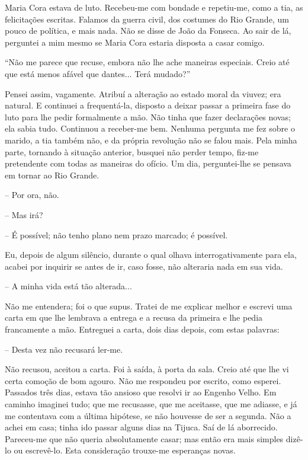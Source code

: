 Maria Cora estava de luto. Recebeu-me com bondade e repetiu-me, como a
tia, as felicitações escritas. Falamos da guerra civil, dos costumes do
Rio Grande, um pouco de política, e mais nada. Não se disse de João da
Fonseca. Ao sair de lá, perguntei a mim mesmo se Maria Cora estaria
disposta a casar comigo.

``Não me parece que recuse, embora não lhe ache maneiras especiais.
Creio até que está menos afável que dantes... Terá mudado?''

Pensei assim, vagamente. Atribuí a alteração ao estado moral da viuvez;
era natural. E continuei a frequentá-la, disposto a deixar passar a
primeira fase do luto para lhe pedir formalmente a mão. Não tinha que
fazer declarações novas; ela sabia tudo. Continuou a receber-me bem.
Nenhuma pergunta me fez sobre o marido, a tia também não, e da própria
revolução não se falou mais. Pela minha parte, tornando à situação
anterior, busquei não perder tempo, fiz-me pretendente com todas as
maneiras do ofício. Um dia, perguntei-lhe se pensava em tornar ao Rio
Grande.

-- Por ora, não.

-- Mas irá?

-- É possível; não tenho plano nem prazo marcado; é possível.

Eu, depois de algum silêncio, durante o qual olhava interrogativamente
para ela, acabei por inquirir se antes de ir, caso fosse, não alteraria
nada em sua vida.

-- A minha vida está tão alterada...

Não me entendera; foi o que supus. Tratei de me explicar melhor e
escrevi uma carta em que lhe lembrava a entrega e a recusa da primeira e
lhe pedia francamente a mão. Entreguei a carta, dois dias depois, com
estas palavras:

-- Desta vez não recusará ler-me.

Não recusou, aceitou a carta. Foi à saída, à porta da sala. Creio até
que lhe vi certa comoção de bom agouro. Não me respondeu por escrito,
como esperei. Passados três dias, estava tão ansioso que resolvi ir ao
Engenho Velho. Em caminho imaginei tudo; que me recusasse, que me
aceitasse, que me adiasse, e já me contentava com a última hipótese, se
não houvesse de ser a segunda. Não a achei em casa; tinha ido passar
alguns dias na Tijuca. Saí de lá aborrecido. Pareceu-me que não queria
absolutamente casar; mas então era mais simples dizê-lo ou escrevê-lo.
Esta consideração trouxe-me esperanças novas.

